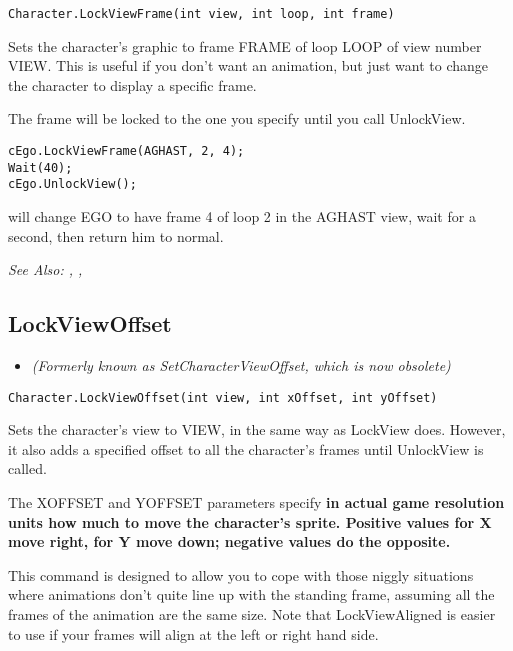\begin{verbatim}
Character.LockViewFrame(int view, int loop, int frame)
\end{verbatim}
Sets the character's graphic to frame FRAME of loop LOOP of view number VIEW.
This is useful if you don't want an animation, but just want to change the
character to display a specific frame.

The frame will be locked to the one you specify until you call UnlockView.

\begin{verbatim}
cEgo.LockViewFrame(AGHAST, 2, 4);
Wait(40);
cEgo.UnlockView();
\end{verbatim}
will change EGO to have frame 4 of loop 2 in the AGHAST view, wait for a second,
then return him to normal.

\it{See Also:} ,
,


\subsection{LockViewOffset}\label{Character.LockViewOffset}%

\begin{itemize}
\item \it{(Formerly known as SetCharacterViewOffset, which is now obsolete)}
\end{itemize}

\begin{verbatim}
Character.LockViewOffset(int view, int xOffset, int yOffset)
\end{verbatim}

Sets the character's view to VIEW, in the same way as LockView does. However,
it also adds a specified offset to all the character's frames until UnlockView
is called.

The XOFFSET and YOFFSET parameters specify \bf{in actual game resolution units} how much
to move the character's sprite. Positive values for X move right, for Y move down; negative
values do the opposite.

This command is designed to allow you to cope with those niggly situations where animations
don't quite line up with the standing frame, assuming all the frames of the animation are
the same size. Note that LockViewAligned is easier to use if your frames will align at
the left or right hand side.

